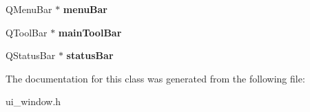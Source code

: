 \begin{DoxyCompactItemize}
\item 
\hypertarget{class_ui___window_ae1f82bcb6b78b1129ed4aa2da15fd080}{}Q\+Menu\+Bar $\ast$ {\bfseries menu\+Bar}\label{class_ui___window_ae1f82bcb6b78b1129ed4aa2da15fd080}

\item 
\hypertarget{class_ui___window_aa2ae6bf07615d6808fa4b6374d98ef01}{}Q\+Tool\+Bar $\ast$ {\bfseries main\+Tool\+Bar}\label{class_ui___window_aa2ae6bf07615d6808fa4b6374d98ef01}

\item 
\hypertarget{class_ui___window_ab6c076e3fb3fa6c143dfd85a13bee089}{}Q\+Status\+Bar $\ast$ {\bfseries status\+Bar}\label{class_ui___window_ab6c076e3fb3fa6c143dfd85a13bee089}

\end{DoxyCompactItemize}


The documentation for this class was generated from the following file\+:\begin{DoxyCompactItemize}
\item 
ui\+\_\+window.\+h\end{DoxyCompactItemize}
